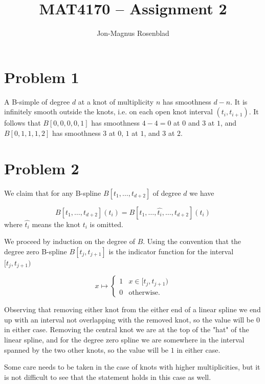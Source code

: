 \documentclass{article}
\title{MAT4170 -- Assignment 2}
\author{Jon-Magnus Rosenblad}
\date{}
\begin{document}
\maketitle

\section*{Problem 1}
A B-simple of degree $d$ at a knot of multiplicity $n$ has smoothness $d - n$.
It is infinitely smooth outside the knots, i.e. on each open knot interval $(t_i,t_{i + 1})$.
It follows that $B[0,0,0,0,1]$ has smoothness $4 - 4=0$ at $0$ and $3$ at $1$,
and $B[0,1,1,1,2]$ has smoothness $3$ at $0$, $1$ at $1$, and $3$ at $2$.


\section*{Problem 2}

We claim that for any B-spline $B[t_1,\ldots,t_{d + 2}]$ of degree $d$
we have 

\begin{equation}
    B[t_1,\ldots, t_{d + 2}](t_i) = B[t_1,\ldots,\hat{t_i},\ldots,t_{d + 2}](t_i)
\end{equation}
where $\hat{t_i}$ means the knot $t_i$ is omitted.

We proceed by induction on the degree of $B$.
Using the convention that the degree zero B-spline $B[t_j,t_{j + 1}]$
is the indicator function for the interval $[t_j,t_{j + 1})$

\begin{equation}
    x\mapsto \begin{cases}
        1   &x\in [t_j, t_{j + 1})\\
        0   &\textrm{otherwise}.
    \end{cases}
\end{equation}

Observing that removing either knot from the either end of a linear spline
we end up with an interval not overlapping with the removed knot,
so the value will be $0$ in either case.
Removing the central knot we are at the top of the "hat" of the linear spline,
and for the degree zero spline we are somewhere in the interval spanned by the two other knots,
so the value will be $1$ in either case.

Some care needs to be taken in the case of knots with higher multiplicities,
but it is not difficult to see that the statement holds in this case as well.
\end{document}
